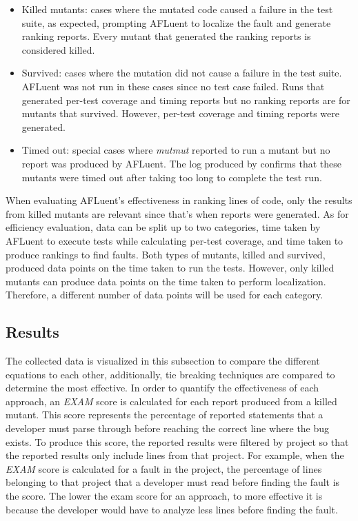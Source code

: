\begin{itemize}
    \item Killed mutants: cases where the mutated code caused a failure in the
    test suite, as expected, prompting AFLuent to localize the fault and
    generate ranking reports.
    Every mutant that generated the ranking reports is
    considered killed.
    \item Survived: cases where the mutation did not cause a failure in the test
    suite. AFLuent was not run in these cases since no test case failed. Runs
    that generated per-test coverage and timing reports but no ranking reports
    are for mutants that survived.
    However, per-test coverage and timing reports were generated.
    \item Timed out: special cases where \emph{mutmut} reported to run a mutant
    but no report was produced by AFLuent. The log produced by 
    confirms that these mutants were timed out after taking too long to complete
    the test run.
\end{itemize}

When evaluating AFLuent's effectiveness in ranking lines of code, only the
results from killed mutants are relevant since that's when reports were
generated. As for efficiency evaluation, data can be split up to two categories,
time taken by AFLuent to execute tests while calculating per-test coverage, and
time taken to produce rankings to find faults. Both types of mutants, killed and
survived, produced data points on the time taken to run the tests. However, only
killed mutants can produce data points on the time taken to perform
localization. Therefore, a different number of data points will be used for each
category.

\subsection{Results}
\label{subsec:eval_results}

The collected data is visualized in this subsection to compare the different
equations to each other, additionally, tie breaking techniques are compared to
determine the most effective. In order to quantify the effectiveness of each
approach, an \emph{EXAM} %
score is calculated for each report produced from a killed mutant. This score
represents the percentage of reported statements that a developer must parse
through before reaching the correct line where the bug exists. To produce this
score, the reported results were filtered by project so that the reported
results only include lines from that project. For example, when the \emph{EXAM}
score is calculated for a fault in the  project, the
percentage of lines belonging to that project that a developer must read before
finding the fault is the score. The lower the exam score for an approach, to
more effective it is because the developer would have to analyze less lines
before finding the fault.

